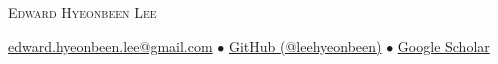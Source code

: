 \documentclass[a4paper,10pt]{extarticle}
\begin{document}
\renewcommand*{\arraystretch}{1.5}

\pagestyle{empty}

\begin{center}
	{\huge \textsc{Edward Hyeonbeen Lee}}
\end{center}

\begin{center}
	\href{mailto:edward.hyeonbeen.lee@gmail.com}{edward.hyeonbeen.lee@gmail.com} $\bullet$ \href{https://github.com/leehyeonbeen}{GitHub (@leehyeonbeen)} $\bullet$ \href{https://scholar.google.com/citations?user=TiduRxoAAAAJ}{Google Scholar}
\end{center}



\end{document}
